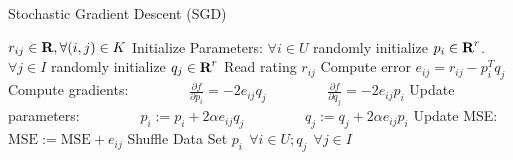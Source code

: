 \documentclass[12pt]{article}
\begin{document}
\begin{algorithm}[H]
\caption{Stochastic Gradient Descent (SGD)}
\begin{algorithmic}
\Require $r_{ij} \in {\mbox{\bf R}},  \forall (i,j)\in K$
\State Initialize Parameters: $\forall i\in U$ randomly initialize $p_i\in {\mbox{\bf R}}^r$. $\forall j\in I$ randomly initialize  $q_j\in {\mbox{\bf R}}^r$
\Repeat
	\State Read rating $r_{ij}$
	\State Compute error $e_{ij} = r_{ij} - p_i^Tq_j$
	\State Compute gradients: 
	\State $\qquad \qquad \frac{\partial f}{\partial p_i} = -2e_{ij}q_j$
	\State $\qquad \qquad \frac{\partial f}{\partial q_j} = -2e_{ij}p_i$
	\State Update parameters:
	\State $\qquad \qquad p_i:=p_i + 2\alpha e_{ij} q_j$
	\State $\qquad \qquad q_j:=q_j + 2\alpha e_{ij} p_i$
	\State Update MSE: $\text{MSE} := \text{MSE} + e_{ij}$
\State Shuffle Data Set
\Ensure $p_i~~\forall i\in U; q_j ~~\forall j\in I$
\end{algorithmic}
\end{algorithm}
\end{document}

